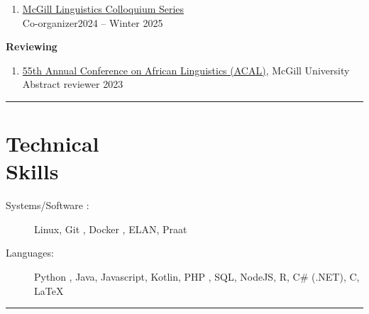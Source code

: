 \documentclass[margin,line]{resume}
\begin{document}
\begin{resume}
\begin{enumerate}[-, leftmargin=1em, topsep=0.5pt]
		\item[] \href{https://www.mcgill.ca/linguistics/events/colloquium-series}{McGill Linguistics Colloquium Series}\\
		      \hphantom{...}Co-organizer\hfill 2024 -- Winter 2025
	\end{enumerate}

	\textbf{Reviewing}
	\begin{enumerate}[-, leftmargin=1em, topsep=0.5pt]
		\item[]  \href{https://acal55.mull-lab.org/}{55th Annual Conference on African Linguistics (ACAL)}, McGill University\\
		      \hphantom{...}Abstract reviewer \hfill 2023
	\end{enumerate}

	\vspace{-0.9em}\rule{\textwidth}{0.4pt}


	\section{\mysidestyle Technical\\Skills}\vspace{2mm}
	\begin{description}
		\item[Systems/Software%
		:] Linux, Git%
		      , Docker%
		      , ELAN, Praat%
		\item[Languages:] Python%
		      , Java, Javascript, Kotlin, PHP%
		      , SQL, NodeJS, R, C\# (.NET),
			  C, \LaTeX
	\end{description}

	\vspace{-1.1em}\rule{\textwidth}{0.4pt}




\end{resume}
\end{document}

